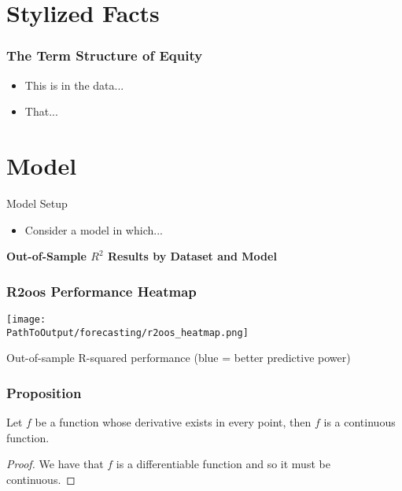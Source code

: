 \documentclass[ignorenonframetext, 9pt]{beamer}
\begin{document}
\section{Stylized Facts}


\begin{frame}
  \frametitle{The Term Structure of Equity}
  \begin{itemize}
  \item This is in the data...
  \item That...
  \end{itemize}
\label{slide:stylized_facts}
\end{frame}

\section{Model}


\begin{frame}{Model Setup}
\begin{itemize}
\item Consider a model in which...
\end{itemize}
\label{slide:state-space-framework}
\hyperlink{slide:stylized_facts}{}
\end{frame}


\begin{frame}[plain]
  \tiny
  \vspace{-0.5cm}
  \centering
  \textbf{Out-of-Sample $R^2$ Results by Dataset and Model}\\
  \vspace{0.2cm}
  
\end{frame}

\begin{frame}
  \frametitle{R2oos Performance Heatmap}
  \centering
  \texttt{[image: \\PathToOutput/forecasting/r2oos\_heatmap.png]}
  \vspace{0.2cm}

  Out-of-sample R-squared performance (blue = better predictive power)
\end{frame}


\begin{frame}
  \frametitle{Proposition}

  \begin{proposition}
    Let \(f\) be a function whose derivative exists in every point, then \(f\) is 
    a continuous function.
  \end{proposition}
  \begin{proof}
    We have that \(f\) is a differentiable function and so it must be continuous.
  \end{proof}
  

\end{frame}
\end{document}
